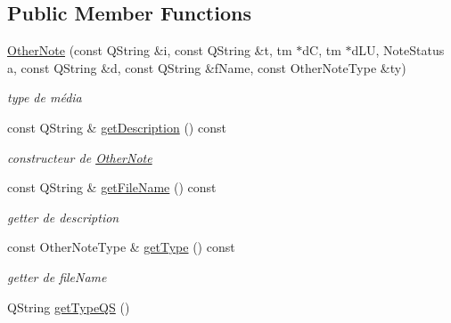 \subsection*{Public Member Functions}
\begin{DoxyCompactItemize}
\item 
\mbox{\label{classOtherNote_a87d089920217a31710359b66704a5b8b}} 
\hyperlink{classOtherNote_a87d089920217a31710359b66704a5b8b}{Other\+Note} (const Q\+String \&i, const Q\+String \&t, tm $\ast$dC, tm $\ast$d\+LU, Note\+Status a, const Q\+String \&d, const Q\+String \&f\+Name, const Other\+Note\+Type \&ty)
\begin{DoxyCompactList}\small\item\em type de média \end{DoxyCompactList}\item 
\mbox{\label{classOtherNote_ade43d1254964968c6522731836b0319d}} 
const Q\+String \& \hyperlink{classOtherNote_ade43d1254964968c6522731836b0319d}{get\+Description} () const
\begin{DoxyCompactList}\small\item\em constructeur de \hyperlink{classOtherNote}{Other\+Note} \end{DoxyCompactList}\item 
\mbox{\label{classOtherNote_a9552e8c54c104ef2905f0cd5e368a796}} 
const Q\+String \& \hyperlink{classOtherNote_a9552e8c54c104ef2905f0cd5e368a796}{get\+File\+Name} () const
\begin{DoxyCompactList}\small\item\em getter de description \end{DoxyCompactList}\item 
\mbox{\label{classOtherNote_a77ffe5215bbfe49b38b80f6c7ae2c8c9}} 
const Other\+Note\+Type \& \hyperlink{classOtherNote_a77ffe5215bbfe49b38b80f6c7ae2c8c9}{get\+Type} () const
\begin{DoxyCompactList}\small\item\em getter de file\+Name \end{DoxyCompactList}\item 
\mbox{\label{classOtherNote_a800b1e0635c1e8530dd9a20d845530ee}} 
Q\+String \hyperlink{classOtherNote_a800b1e0635c1e8530dd9a20d845530ee}{get\+Type\+QS} ()

\end{DoxyCompactItemize}
